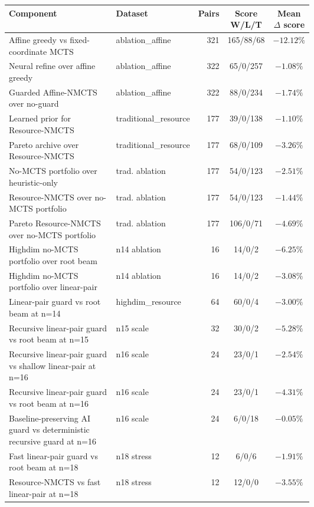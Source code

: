 \begin{tabular}{@{}p{0.40\linewidth}p{0.20\linewidth}rcc@{}}
\toprule
Component & Dataset & Pairs & Score W/L/T & Mean $\Delta$ score \\
\midrule
Affine greedy vs fixed-coordinate MCTS & ablation\_affine & 321 & 165/88/68 & $-12.12\%$ \\
Neural refine over affine greedy & ablation\_affine & 322 & 65/0/257 & $-1.08\%$ \\
Guarded Affine-NMCTS over no-guard & ablation\_affine & 322 & 88/0/234 & $-1.74\%$ \\
Learned prior for Resource-NMCTS & traditional\_resource & 177 & 39/0/138 & $-1.10\%$ \\
Pareto archive over Resource-NMCTS & traditional\_resource & 177 & 68/0/109 & $-3.26\%$ \\
No-MCTS portfolio over heuristic-only & trad. ablation & 177 & 54/0/123 & $-2.51\%$ \\
Resource-NMCTS over no-MCTS portfolio & trad. ablation & 177 & 54/0/123 & $-1.44\%$ \\
Pareto Resource-NMCTS over no-MCTS portfolio & trad. ablation & 177 & 106/0/71 & $-4.69\%$ \\
Highdim no-MCTS portfolio over root beam & n14 ablation & 16 & 14/0/2 & $-6.25\%$ \\
Highdim no-MCTS portfolio over linear-pair & n14 ablation & 16 & 14/0/2 & $-3.08\%$ \\
Linear-pair guard vs root beam at n=14 & highdim\_resource & 64 & 60/0/4 & $-3.00\%$ \\
Recursive linear-pair guard vs root beam at n=15 & n15 scale & 32 & 30/0/2 & $-5.28\%$ \\
Recursive linear-pair guard vs shallow linear-pair at n=16 & n16 scale & 24 & 23/0/1 & $-2.54\%$ \\
Recursive linear-pair guard vs root beam at n=16 & n16 scale & 24 & 23/0/1 & $-4.31\%$ \\
Baseline-preserving AI guard vs deterministic recursive guard at n=16 & n16 scale & 24 & 6/0/18 & $-0.05\%$ \\
Fast linear-pair guard vs root beam at n=18 & n18 stress & 12 & 6/0/6 & $-1.91\%$ \\
Resource-NMCTS vs fast linear-pair at n=18 & n18 stress & 12 & 12/0/0 & $-3.55\%$ \\
\bottomrule
\end{tabular}
